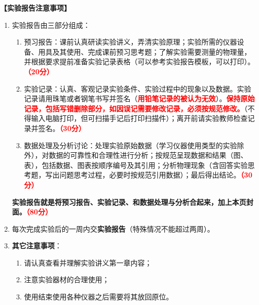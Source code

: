 \documentclass[dvipsnames, svgnames,a4paper,11pt]{article}
\begin{document}
	\textbf{【实验报告注意事项】}
	\begin{enumerate}
		\item 实验报告由三部分组成：
		\begin{enumerate}
			\item 预习报告：课前认真研读实验讲义，弄清实验原理；实验所需的仪器设备、用具及其使用、完成课前预习思考题；了解实验需要测量的物理量，并根据要求提前准备实验记录表格（可以参考实验报告模板，可以打印）。\textcolor{red}{\textbf{（20分）}}
			\item 实验记录：认真、客观记录实验条件、实验过程中的现象以及数据。实验记录请用珠笔或者钢笔书写并签名（\textcolor{red}{\textbf{用铅笔记录的被认为无效}}）。\textcolor{red}{\textbf{保持原始记录，包括写错删除部分，如因误记需要修改记录，必须按规范修改。}}（不得输入电脑打印，但可扫描手记后打印扫描件）；离开前请实验教师检查记录并签名。\textcolor{red}{\textbf{（30分）}}
			\item 数据处理及分析讨论：处理实验原始数据（学习仪器使用类型的实验除外），对数据的可靠性和合理性进行分析；按规范呈现数据和结果（图、表），包括数据、图表按顺序编号及其引用；分析物理现象（含回答实验思考题，写出问题思考过程，必要时按规范引用数据）；最后得出结论。\textcolor{red}{\textbf{（30分）}}
		\end{enumerate}
		\textbf{实验报告就是将预习报告、实验记录、和数据处理与分析合起来，加上本页封面。\textcolor{red}{（80分）}}
		\item 每次完成实验后的一周内交\textbf{实验报告}（特殊情况不能超过两周）。
		\item \textbf{其它注意事项}：
		\begin{enumerate}
			\item 请认真查看并理解实验讲义第一章内容；
			\item 注意实验器材的合理使用；
			\item 使用结束使用各种仪器之后需要将其放回原位。
		\end{enumerate}
	\end{enumerate}
	
	
	
%	
	
\end{document}
